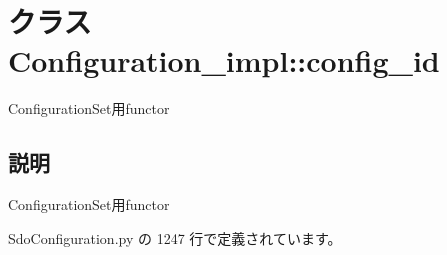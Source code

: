 \section{クラス Configuration\_\-impl::config\_\-id}
\label{classsource__py_1_1_sdo_configuration_1_1_configuration__impl_1_1config__id}
ConfigurationSet用functor  




\subsection{説明}
ConfigurationSet用functor 

 SdoConfiguration.py の 1247 行で定義されています。